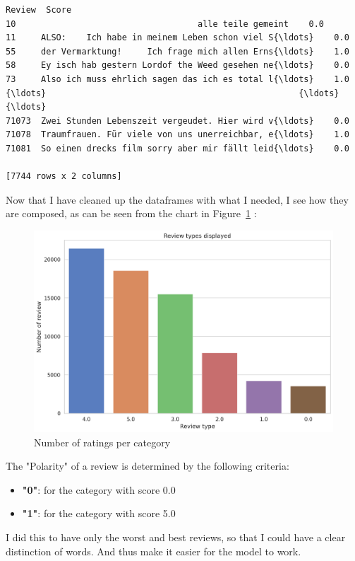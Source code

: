             \begin{tcolorbox}[breakable, size=fbox, boxrule=.5pt, pad at break*=1mm, opacityfill=0]
\begin{Verbatim}[commandchars=\\\{\},fontsize=\footnotesize]
                                                  Review  Score
10                                    alle teile gemeint    0.0
11     ALSO:    Ich habe in meinem Leben schon viel S{\ldots}    0.0
55     der Vermarktung!     Ich frage mich allen Erns{\ldots}    1.0
58     Ey isch hab gestern Lordof the Weed gesehen ne{\ldots}    0.0
73     Also ich muss ehrlich sagen das ich es total l{\ldots}    1.0
{\ldots}                                                  {\ldots}    {\ldots}
71073  Zwei Stunden Lebenszeit vergeudet. Hier wird v{\ldots}    0.0
71078  Traumfrauen. Für viele von uns unerreichbar, e{\ldots}    1.0
71081  So einen drecks film sorry aber mir fällt leid{\ldots}    0.0

[7744 rows x 2 columns]
\end{Verbatim}
\end{tcolorbox}

Now that I have cleaned up the dataframes with what I needed, I see how they are composed, as can be seen from the chart in Figure~\ref{fig:fig_03} :

\begin{figure}[H]
\centering
\includegraphics[width=1\textwidth]{images/output_37_1.png}
\caption{Number of ratings per category}
\label{fig:fig_03}
\end{figure}
\FloatBarrier


The "Polarity" of a review is determined by the following criteria:
\begin{itemize}
\item \textbf{"0"}: for the category with score 0.0
\item \textbf{"1"}: for the category with score 5.0
\end{itemize}
I did this to have only the worst and best reviews, so that I could have a clear distinction of words. And thus make it easier for the model to work.

